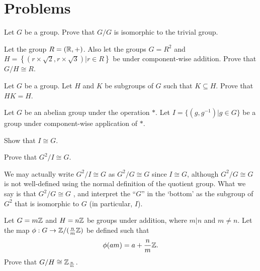 \newpage

\section{Problems}
\begin{problem}
    Let $G$ be a group. Prove that $G/G$ is isomorphic to the trivial group.
\end{problem}

\begin{problem}
    Let the group $R = (\mathbb{R}, +)$. Also let the groups $G = R^2$ and $H = \left\{(r\times\sqrt2, r\times\sqrt3) \vert r\in R\right\}$ be under component-wise addition. Prove that $G/H \cong R$.
\end{problem}

\begin{problem}\label{problem-subgroup-product-equal-to-subgroup-if-one-is-subgroup-of-another}
    Let $G$ be a group. Let $H$ and $K$ be subgroups of $G$ such that $K \subseteq H$. Prove that $HK = H$.
\end{problem}

\begin{problem}\label{problem-cartesian-product-of-group-by-group-isomorphic-to-group}
    Let $G$ be an abelian group under the operation $\ast$. Let $I = \{(g, g^{-1}) \vert g \in G\}$ be a group under component-wise application of $\ast$.
    \begin{partquestions}{\alph*}
        \item Show that $I \cong G$.
        \item Prove that $G^2/I \cong G$.
    \end{partquestions}
\end{problem}
\begin{remark}
    We may actually write $G^2/I \cong G$ as $G^2/G \cong G$ since $I \cong G$, although $G^2/G \cong G$ is not well-defined using the normal definition of the quotient group. What we say is that $G^2/G \cong G$ , and interpret the ``$G$'' in the `bottom' as the subgroup of $G^2$ that is isomorphic to $G$ (in particular, $I$).
\end{remark}

\begin{problem}\label{problem-mZ/nZ-isomorphic-to-Zn/m}
    Let $G = m\mathbb{Z}$ and $H = n\mathbb{Z}$ be groups under addition, where $m\vert n$ and $m \neq n$. Let the map $\phi: G \to \mathbb{Z}/({\frac nm}\mathbb{Z})$ be defined such that
    \[
        \phi(am) = a + \frac nm \mathbb{Z}.
    \]
    Prove that $G/H \cong \mathbb{Z}_{\frac nm}$.
\end{problem}
